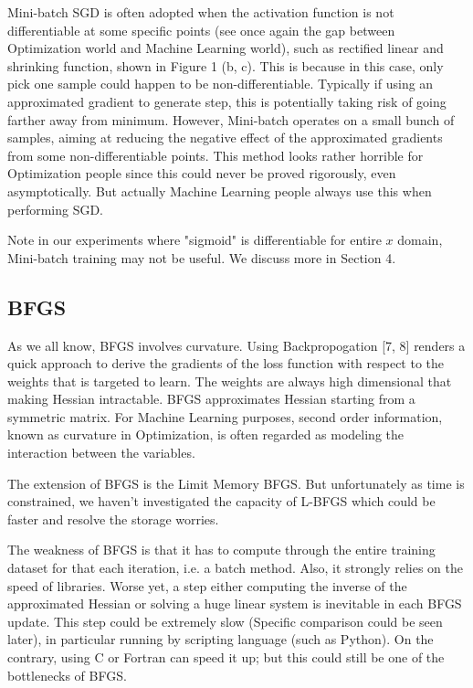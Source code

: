 \documentclass{article} %
\begin{document}
\begin{itemize}
   Mini-batch SGD is often adopted when the activation function is not differentiable at some specific points (see once again the gap between Optimization world and Machine Learning world), such as rectified linear and shrinking function, shown in Figure 1 (b, c). This is because in this case, only pick one sample could happen to be non-differentiable. Typically if using an approximated gradient to generate step, this is potentially taking risk of going farther away from minimum. However, Mini-batch operates on a small bunch of samples, aiming at reducing the negative effect of the approximated gradients from some non-differentiable points. This method looks rather horrible for Optimization people since this could never be proved rigorously, even asymptotically. But actually Machine Learning people always use this when performing SGD.

   Note in our experiments where "sigmoid" is differentiable for entire $x$ domain,  Mini-batch training may not be useful. We discuss more in Section 4.
\end{itemize}

\subsection{BFGS}
As we all know, BFGS involves curvature. Using Backpropogation [7, 8] renders a quick approach to derive the gradients of the loss function with respect to the weights that is targeted to learn. The weights are always high dimensional that making Hessian intractable. BFGS approximates Hessian starting from a symmetric matrix. For Machine Learning purposes, second order information, known as curvature in Optimization, is often regarded as modeling the interaction between the variables.

The extension of BFGS is the Limit Memory BFGS. But unfortunately as time is constrained, we haven't investigated the capacity of L-BFGS which could be faster and resolve the storage worries. 

The weakness of BFGS is that it has to compute through the entire training dataset for that each iteration, i.e. a batch method. Also, it strongly relies on the speed of libraries. Worse yet, a step either computing the inverse of the approximated Hessian or solving a huge linear system is inevitable in each BFGS update. This step could be extremely slow (Specific comparison could be seen later), in particular running by scripting language (such as Python). On the contrary, using C or Fortran can speed it up; but this could still be one of the bottlenecks of BFGS.
\end{document}
